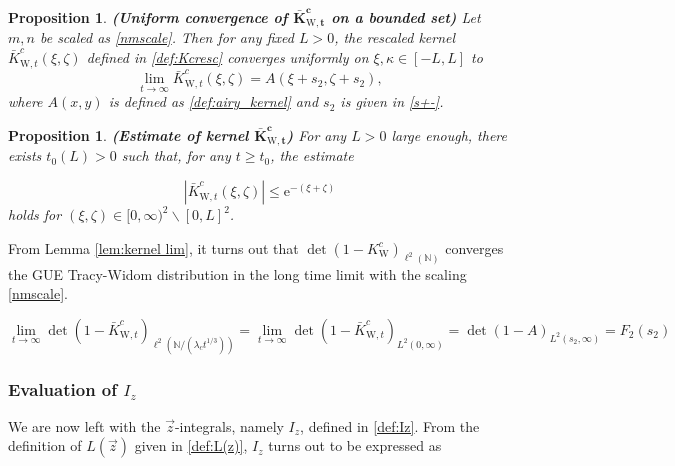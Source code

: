 \documentclass[cmp]{svjour}
\numberwithin{theorem}{section}
\numberwithin{equation}{section}
\newtheorem{prop}[theorem]{Proposition}
\begin{document}
\medskip
\begin{prop}
\label{uniform convergence kernelc2}
{\rm \textbf{(Uniform convergence of $\boldsymbol{\bar{K}^c_{\mathrm{W},t}}$ on a bounded set)}}
Let $m,n$ be scaled as \eqref{nmscale}. Then for any fixed $L>0$, the rescaled kernel $\bar{K}_{\mathrm{W},t}^{c} (\xi , \zeta)$ defined in \eqref{def:Kcresc} converges uniformly on $\xi,\kappa\in [-L,L]$ to
\begin{equation*}
\label{KcW limit}
\lim_{t \rightarrow \infty}
\bar{K}_{\mathrm{W},t}^{c} (\xi , \zeta)
= A(\xi + s_2 , \zeta + s_2), 
\end{equation*}
where $A(x,y)$ is defined as \eqref{def:airy_kernel} and $s_2$ is given in \eqref{s+-}. 
\end{prop}

\medskip
\begin{prop}
\label{exp_bound_W}
{\rm \textbf{(Estimate of kernel $\boldsymbol{\bar{K}^c_{\mathrm{W},t}}$)} }
For any $L > 0$ large enough, there exists $t_0(L) > 0$ such that, for any $t \geq t_0$, the estimate

\begin{equation*}\label{exp_bound_W_claim}
\left| \bar{K}_{\mathrm{W},t}^{c}(\xi, \zeta) \right| \leq \mathrm{e}^{-(\xi + \zeta)}
\end{equation*}
holds for $( \xi , \zeta ) \in {[0 , \infty)}^2 \backslash {[0 , L]}^2 $.
\end{prop}
From Lemma \ref{lem:kernel lim}, it turns out that ${\det\left( 1 - K^c_{\mathrm{W}} \right)}_{\ell^2(\mathbb{N})}$ converges the GUE Tracy-Widom distribution in the long time limit with the scaling \eqref{nmscale}.

\begin{equation}
\label{detKcW limit}
\lim_{t\rightarrow\infty} \det(1 - \bar{K}^c_{\mathrm{W},t})_{\ell^2(\mathbb{N}/(\lambda_c t^{1/3}))} =  \lim_{t\rightarrow\infty} \det(1 - \bar{K}^c_{\mathrm{W},t})_{L^2(0,\infty)} = \det(1-A)_{L^2(s_2 , \infty)} = F_2(s_2)
\end{equation}

\subsubsection{Evaluation of $I_z$}
\label{se:Iz}

We are now left with the $\vec{z}$-integrals, namely $I_z$, defined in \eqref{def:Iz}.
From the definition of $L(\vec{z})$ given in \eqref{def:L(z)}, $I_z$ turns out to be expressed as
\end{document}
